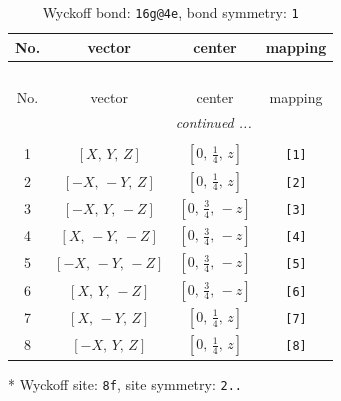 \documentclass[fleqn,8pt]{jsarticle}
\begin{document}
\renewcommand{\arraystretch}{1.2}
\begin{longtable}{cccc}
\caption{Wyckoff bond: {\tt 16g@4e}, bond symmetry: {\tt 1}}
 \\
 \hline \hline
No. & vector & center & mapping \\ \hline \endfirsthead

\multicolumn{3}{l}{\tablename\ \thetable{}} \\
 \hline \hline
No. & vector & center & mapping \\ \hline \endhead

 \hline \hline
\multicolumn{3}{r}{\footnotesize\it continued ...} \\ \endfoot

 \hline \hline
\multicolumn{3}{r}{} \\ \endlastfoot

1 & $\left[ X,\, Y,\, Z \right]$ & $\left[ 0,\, \frac{1}{4},\, z \right]$ & {\tt [1]} \\ \hline
2 & $\left[ - X,\, - Y,\, Z \right]$ & $\left[ 0,\, \frac{1}{4},\, z \right]$ & {\tt [2]} \\ \hline
3 & $\left[ - X,\, Y,\, - Z \right]$ & $\left[ 0,\, \frac{3}{4},\, - z \right]$ & {\tt [3]} \\ \hline
4 & $\left[ X,\, - Y,\, - Z \right]$ & $\left[ 0,\, \frac{3}{4},\, - z \right]$ & {\tt [4]} \\ \hline
5 & $\left[ - X,\, - Y,\, - Z \right]$ & $\left[ 0,\, \frac{3}{4},\, - z \right]$ & {\tt [5]} \\ \hline
6 & $\left[ X,\, Y,\, - Z \right]$ & $\left[ 0,\, \frac{3}{4},\, - z \right]$ & {\tt [6]} \\ \hline
7 & $\left[ X,\, - Y,\, Z \right]$ & $\left[ 0,\, \frac{1}{4},\, z \right]$ & {\tt [7]} \\ \hline
8 & $\left[ - X,\, Y,\, Z \right]$ & $\left[ 0,\, \frac{1}{4},\, z \right]$ & {\tt [8]} \\
\end{longtable}
* Wyckoff site: {\tt 8f}, site symmetry: {\tt 2..}
\renewcommand{\arraystretch}{1.2}
\end{document}
